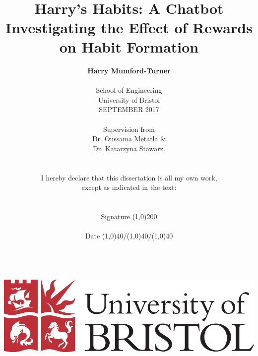 

\date{} %

\title{\huge{\textbf{\\\\\\Harry's Habits: A Chatbot Investigating the Effect of Rewards on Habit Formation}}}
\author{\textbf{Harry Mumford-Turner}\\
\\
School of Engineering\\
University of Bristol\\
SEPTEMBER 2017\\
\\
Supervision from\\
Dr. Oussama Metatla \&\\Dr. Katarzyna Stawarz.
\\
\\\\
I hereby declare that this dissertation is all my own work,\\
except as indicated in the text:\\
\\
\\
Signature \line(1,0){200}\\
\\
Date \line(1,0){40}/\line(1,0){40}/\line(1,0){40}\\
\\
\\
\\
\\
\includegraphics[scale=0.29]{resources/UoB-logo.png}}
